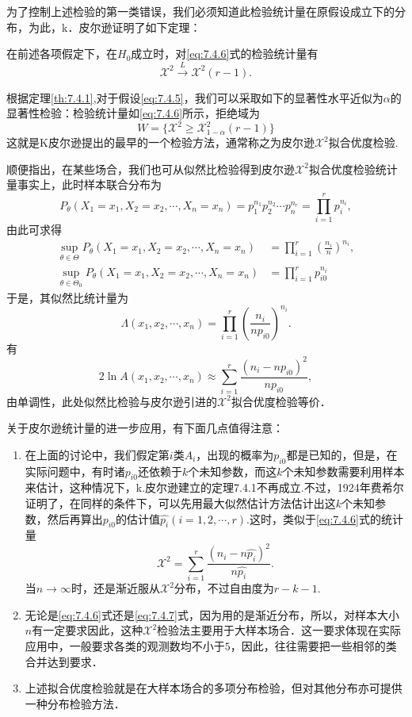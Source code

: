 为了控制上述检验的第一类错误，我们必须知道此检验统计量在原假设成立下的分布，为此，k．皮尔逊证明了如下定理：
\begin{theorem}
    \label{th:7.4.1}
    在前述各项假定下，在$H_0$成立时，对\eqref{eq:7.4.6}式的检验统计量有$${\mathcal X}^{2} \xrightarrow{L} {\mathcal X}^{2}(r-1).$$
\end{theorem}
根据定理\ref{th:7.4.1},对于假设\eqref{eq:7.4.5}，我们可以采取如下的显著性水平近似为$\alpha$的显著性检验：检验统计量如\eqref{eq:7.4.6}所示，拒绝域为
$$
    W = \{{\mathcal X}^{2}\geq {\mathcal X}^{2}_{1-\alpha}(r-1) \}
$$
这就是K皮尔逊提出的最早的一个检验方法，通常称之为皮尔逊${\mathcal X}^{2}$拟合优度检验.

顺便指出，在某些场合，我们也可从似然比检验得到皮尔逊${\mathcal X}^{2}$拟合优度检验统计量事实上，此时样本联合分布为
$$P_{\theta}(X_{1}=x_{1},X_{2}=x_{2},\cdots,X_{n}=x_{n})=p_{1}^{n_{1}}p_{2}^{n_{2}}\cdots p_{n}^{n_r}=\prod_{i=1}^{r}p_{i}^{n_{i}},$$
由此可求得
$$
    \begin{aligned}
        \sup_{\theta \in \Theta}P_{\theta}(X_{1}=x_{1},X_{2}=x_{2},\cdots,X_{n}=x_{n})     & =\prod_{i=1}^{r}\left(\frac{n_{i}}{n}\right)^{n_{i}}, \\
        \sup_{\theta \in \Theta_{0}}P_{\theta}(X_{1}=x_{1},X_{2}=x_{2},\cdots,X_{n}=x_{n}) & =\prod_{i=1}^{r}p_{i0}^{n_{i}}
    \end{aligned}
$$
于是，其似然比统计量为
$$\Lambda(x_{1},x_{2},\cdots,x_{n})=\prod_{i=1}^{r}\left(\frac{n_{i}}{n p_{i0}}\right)^{n_{i}}.$$
有
$$2\ln A(x_{1},x_{2},\cdots,x_{n})\approx\sum_{i=1}^{r}\frac{(n_{i}-np_{i0})^{2}}{np_{i0}},$$
由单调性，此处似然比检验与皮尔逊引进的${\mathcal X}^2$拟合优度检验等价．

关于皮尔逊统计量的进一步应用，有下面几点值得注意：
\begin{enumerate}
    \item 在上面的讨论中，我们假定第$i$类$A_i$，出现的概率为$p_{i0}$都是已知的，但是，在实际问题中，有时诸$p_{i0}$还依赖于$k$个未知参数，而这$k$个未知参数需要利用样本来估计，这种情况下，k.皮尔逊建立的定理7.4.1不再成立.不过，1924年费希尔证明了，在同样的条件下，可以先用最大似然估计方法估计出这$k$个未知参数，然后再算出$p_{i0}$的估计值$\hat{p_i}(i=1,2,\cdots,r)$.这时，类似于\eqref{eq:7.4.6}式的统计量
          \begin{equation}
              \label{eq:7.4.7}
              {\mathcal X}^{2}=\sum_{i=1}^{r}\frac{(n_{i}-n \hat{p_{i}})^2}{n \hat{p_{i}}}.
          \end{equation}
          当$n \to \infty$时，还是渐近服从${\mathcal X}^2$分布，不过自由度为$r-k-1$.
    \item 无论是\eqref{eq:7.4.6}式还是\eqref{eq:7.4.7}式，因为用的是渐近分布，所以，对样本大小$n$有一定要求因此，这种${\mathcal X}^2$检验法主要用于大样本场合．这一要求体现在实际应用中，一般要求各类的观测数均不小于$5$，因此，往往需要把一些相邻的类合并达到要求．
    \item 上述拟合优度检验就是在大样本场合的多项分布检验，但对其他分布亦可提供一种分布检验方法．
\end{enumerate}

